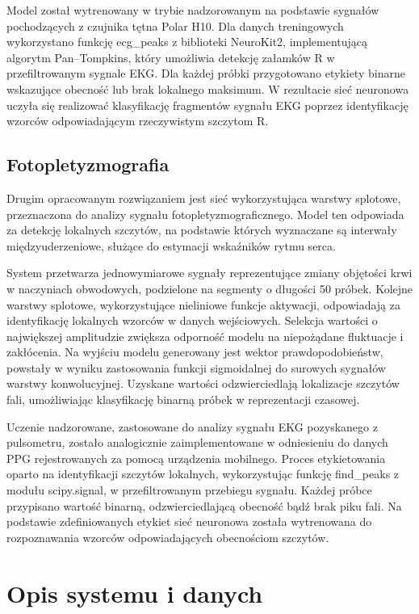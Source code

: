 \documentclass[journal]{IEEEtran}
\begin{document}
Model został wytrenowany w trybie nadzorowanym na podstawie sygnałów pochodzących z czujnika tętna Polar H10. Dla danych treningowych wykorzystano funkcję ecg\_peaks z biblioteki NeuroKit2, implementującą algorytm Pan–Tompkins, który umożliwia detekcję załamków R w przefiltrowanym sygnale EKG. Dla każdej próbki przygotowano etykiety binarne wskazujące obecność lub brak lokalnego maksimum. W rezultacie sieć neuronowa uczyła się realizować klasyfikację fragmentów sygnału EKG poprzez identyfikację wzorców odpowiadającym rzeczywistym szczytom R.


\subsection{Fotopletyzmografia}
Drugim opracowanym rozwiązaniem jest sieć wykorzystująca warstwy splotowe, przeznaczona do analizy sygnału fotopletyzmograficznego. Model ten odpowiada za detekcję lokalnych szczytów, na podstawie których wyznaczane są interwały międzyuderzeniowe, służące do estymacji wskaźników rytmu serca.

System przetwarza jednowymiarowe sygnały reprezentujące zmiany objętości krwi w naczyniach obwodowych, podzielone na segmenty o długości 50 próbek. Kolejne warstwy splotowe, wykorzystujące nieliniowe funkcje aktywacji, odpowiadają za identyfikację lokalnych wzorców w danych wejściowych. Selekcja wartości o największej amplitudzie zwiększa odporność modelu na niepożądane fluktuacje i zakłócenia. Na wyjściu modelu generowany jest wektor prawdopodobieństw, powstały w wyniku zastosowania funkcji sigmoidalnej do surowych sygnałów warstwy konwolucyjnej. Uzyskane wartości odzwierciedlają lokalizacje szczytów fali, umożliwiając klasyfikację binarną próbek w reprezentacji czasowej.


Uczenie nadzorowane, zastosowane do analizy sygnału EKG pozyskanego z pulsometru, zostało analogicznie zaimplementowane w odniesieniu do danych PPG rejestrowanych za pomocą urządzenia mobilnego. Proces etykietowania oparto na identyfikacji szczytów lokalnych, wykorzystując funkcję find\_peaks z modułu scipy.signal, w przefiltrowanym przebiegu sygnału. Każdej próbce przypisano wartość binarną, odzwierciedlającą obecność bądź brak piku fali. Na podstawie zdefiniowanych etykiet sieć neuronowa została wytrenowana do rozpoznawania wzorców odpowiadających obecnościom szczytów.

\newpage
\section{Opis systemu i danych}
\end{document}
